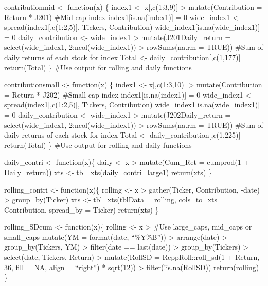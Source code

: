 \documentclass[
]{article}
\begin{document}
contributionmid \textless- function(x) \{ index1 \textless-
x{[},c(1:3,9){]} \textbar\textgreater{} mutate(Contribution = Return *
J201) \#Mid cap index index1{[}is.na(index1){]} = 0 wide\_index1
\textless- spread(index1{[},c(1:2,5){]}, Tickers, Contribution)
wide\_index1{[}is.na(wide\_index1){]} = 0 daily\_contribution \textless-
wide\_index1 \textbar\textgreater{} mutate(J201Daily\_return =
select(wide\_index1, 2:ncol(wide\_index1)) \textbar\textgreater{}
rowSums(na.rm = TRUE)) \#Sum of daily returns of each stock for index
Total \textless- daily\_contribution{[},c(1,177){]} return(Total) \}
\#Use output for rolling and daily functions

contributionsmall \textless- function(x) \{ index1 \textless-
x{[},c(1:3,10){]} \textbar\textgreater{} mutate(Contribution = Return *
J202) \#Small cap index index1{[}is.na(index1){]} = 0 wide\_index1
\textless- spread(index1{[},c(1:2,5){]}, Tickers, Contribution)
wide\_index1{[}is.na(wide\_index1){]} = 0 daily\_contribution \textless-
wide\_index1 \textbar\textgreater{} mutate(J202Daily\_return =
select(wide\_index1, 2:ncol(wide\_index1)) \textbar\textgreater{}
rowSums(na.rm = TRUE)) \#Sum of daily returns of each stock for index
Total \textless- daily\_contribution{[},c(1,225){]} return(Total) \}
\#Use output for rolling and daily functions

daily\_contri \textless- function(x)\{ daily \textless- x
\textbar\textgreater{} mutate(Cum\_Ret = cumprod(1 + Daily\_return)) xts
\textless- tbl\_xts(daily\_contri\_large1) return(xts) \}

rolling\_contri \textless- function(x)\{ rolling \textless- x
\textbar\textgreater{} gather(Ticker, Contribution, -date)
\textbar\textgreater{} group\_by(Ticker) xts \textless- tbl\_xts(tblData
= rolling, cols\_to\_xts = Contribution, spread\_by = Ticker)
return(xts) \}

rolling\_SDcum \textless- function(x)\{ rolling \textless- x
\textbar\textgreater{} \#Use large\_caps, mid\_caps or small\_caps
mutate(YM = format(date, ``\%Y\%B'')) \textbar\textgreater{}
arrange(date) \textbar\textgreater{} group\_by(Tickers, YM)
\textbar\textgreater{} filter(date == last(date)) \textbar\textgreater{}
group\_by(Tickers) \textbar\textgreater{} select(date, Tickers, Return)
\textbar\textgreater{} mutate(RollSD = RcppRoll::roll\_sd(1 + Return,
36, fill = NA, align = ``right'') * sqrt(12)) \textbar\textgreater{}
filter(!is.na(RollSD)) return(rolling) \}
\end{document}
